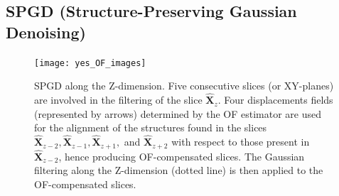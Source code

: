\documentclass{article}
\begin{document}




\subsection{SPGD (Structure-Preserving Gaussian Denoising)}

\begin{figure}
  \centering
  \texttt{[image: yes\_OF\_images]}
  \caption{SPGD along the $\mathrm{Z}$-dimension. Five consecutive
    slices (or $\mathrm{XY}$-planes) are involved in the filtering of
    the slice $\hat{\mathbf{X}}_z$. Four displacements fields
    (represented by arrows) determined by the OF estimator are used
    for the alignment of the structures found in the slices
    $\hat{\mathbf{X}}_{z-2}, \hat{\mathbf{X}}_{z-1},
    \hat{\mathbf{X}}_{z+1},$ and $\hat{\mathbf{X}}_{z+2}$ with respect
    to those present in $\hat{\mathbf{X}}_{z-2}$, hence producing
    OF-compensated slices. The Gaussian filtering along the
    $\text{Z}$-dimension (dotted line) is then applied to the
    OF-compensated slices.\label{fig:SPGD}}
\end{figure}
\end{document}

